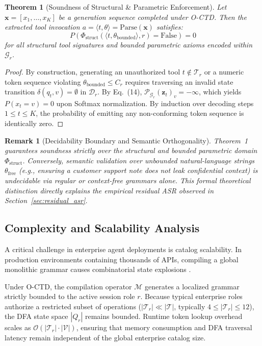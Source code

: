 \documentclass[preprint,12pt,3p]{elsarticle}
\newtheorem{theorem}{Theorem}
\newtheorem{remark}{Remark}
\begin{document}
\begin{theorem}[Soundness of Structural \& Parametric Enforcement]
Let $\mathbf{x} = [x_1, \dots, x_K]$ be a generation sequence completed under O-CTD. Then the extracted tool invocation $a = \langle t, \theta \rangle = \text{Parse}(\mathbf{x})$ satisfies:
\begin{equation}
    P\left( \Phi_{\text{struct}}(\langle t, \theta_{\text{bounded}} \rangle, r) = \text{False} \right) = 0
\end{equation}
for all structural tool signatures and bounded parametric axioms encoded within $\mathcal{G}_r$.
\end{theorem}
\begin{proof}
By construction, generating an unauthorized tool $t \notin \mathcal{T}_r$ or a numeric token sequence violating $\theta_{\text{bounded}} \le C_r$ requires traversing an invalid state transition $\delta(q_t, v) = \emptyset$ in $\mathcal{D}_r$. By Eq.~(14), $\mathcal{P}_{\mathcal{G}_r}(\mathbf{z}_t)_v = -\infty$, which yields $P(x_t = v) = 0$ upon Softmax normalization. By induction over decoding steps $1 \le t \le K$, the probability of emitting any non-conforming token sequence is identically zero.
\end{proof}

\begin{remark}[Decidability Boundary and Semantic Orthogonality]
Theorem~1 guarantees soundness strictly over the structural and bounded parametric domain $\Phi_{\text{struct}}$. Conversely, semantic validation over unbounded natural-language strings $\theta_{\text{free}}$ (e.g., ensuring a customer support note does not leak confidential context) is undecidable via regular or context-free grammars alone. This formal theoretical distinction directly explains the empirical residual ASR observed in Section~\ref{sec:residual_asr}.
\end{remark}

\subsection{Complexity and Scalability Analysis}

A critical challenge in enterprise agent deployments is catalog scalability. In production environments containing thousands of APIs, compiling a global monolithic grammar causes combinatorial state explosions \cite{roy2024automata}. 

Under O-CTD, the compilation operator $\mathcal{M}$ generates a localized grammar strictly bounded to the active session role $r$. Because typical enterprise roles authorize a restricted subset of operations ($|\mathcal{T}_r| \ll |\mathcal{T}|$, typically $4 \le |\mathcal{T}_r| \le 12$), the DFA state space $|Q_r|$ remains bounded. Runtime token lookup overhead scales as $\mathcal{O}(|\mathcal{T}_r| \cdot |\mathcal{V}|)$, ensuring that memory consumption and DFA traversal latency remain independent of the global enterprise catalog size.
\end{document}
